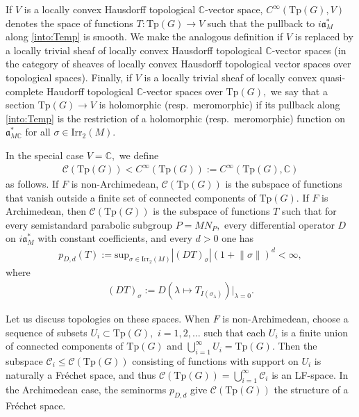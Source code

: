 \documentclass[12pt]{amsart}
\theoremstyle{remark}
\numberwithin{equation}{section}
\newcommand{\CC}{\mathbb{C}}
\theoremstyle{definition}
\numberwithin{equation}{subsection}
\newcommand{\norm}[1]{\lVert#1\rVert}
\begin{document}
If $V$ is a locally convex Hausdorff topological $\CC$-vector space, 
$C^\infty(\mathrm{Tp}(G),V)$ denotes the space of functions $T:\mathrm{Tp}(G) \to V$ such that the pullback to $i\mathfrak{a}_M^*$ along \eqref{into:Temp} is smooth.  We make the analogous definition if $V$ is replaced by a locally trivial sheaf of locally convex Hausdorff topological $\CC$-vector spaces (in the category of sheaves of locally convex Hausdorff topological vector spaces over topological spaces).  Finally, if $V$ is a locally trivial sheaf of locally convex quasi-complete Haudorff topological $\CC$-vector spaces over $\mathrm{Tp}(G),$ we say that a section $\mathrm{Tp}(G) \to V$
is holomorphic (resp.~meromorphic) if its pullback along \eqref{into:Temp} is the restriction of a holomorphic (resp.~meromorphic) function on $\mathfrak{a}_{M\CC}^*$ for all $\sigma \in \mathrm{Irr}_2(M).$ 

In the special case $V=\CC,$ we define 
\begin{align} \label{CT:spaces}
    \mathcal{C}(\mathrm{Tp}(G)) <C^\infty(\mathrm{Tp}(G)):=C^\infty(\mathrm{Tp}(G),\CC)
\end{align}
as follows.  If $F$ is non-Archimedean, $\mathcal{C}(\mathrm{Tp}(G))$ is the subspace of functions that vanish outside a finite set of connected components of $\mathrm{Tp}(G).$ 
If $F$ is Archimedean, then $\mathcal{C}(\mathrm{Tp}(G))$ is the subspace of functions $T$ such that for every semistandard parabolic subgroup $P=MN_P,$ every differential operator $D$ on $i\mathfrak{a}_M^\ast$ with constant coefficients, and every $d>0$ one has
\begin{align*} 
p_{D,d}(T):=\mathrm{sup}_{\sigma \in \mathrm{Irr}_2(M)}|(DT)_{\sigma}|(1+\norm{\sigma})^d<\infty,
\end{align*}
where 
\begin{align} \label{D:def}
    (DT)_{\sigma}:=D(\lambda\mapsto T_{I(\sigma_\lambda)})|_{\lambda=0}.
\end{align}

Let us discuss topologies on these spaces.  When $F$ is non-Archimedean, choose a sequence of subsets $U_i \subset \mathrm{Tp}(G),$ $i=1,2,\dots$ such that each $U_i$ is a finite union of connected components of $\mathrm{Tp}(G)$ and $\bigcup_{i=1}^\infty U_i=\mathrm{Tp}(G).$  Then the subspace $\mathcal{C}_i \leq \mathcal{C}(\mathrm{Tp}(G))$ consisting of functions with support on $U_i$ is naturally a Fr\'echet space, and thus $\mathcal{C}(\mathrm{Tp}(G))=\bigcup_{i=1}^\infty \mathcal{C}_i$ is an LF-space.  In the Archimedean case, the seminorms $p_{D,d}$ give $\mathcal{C}(\mathrm{Tp}(G))$ the structure of a Fr\'echet space.
\end{document}
